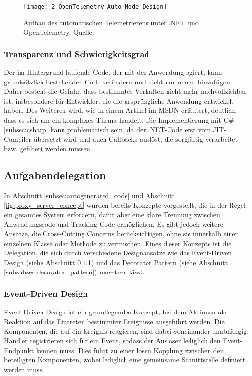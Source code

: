 \begin{figure}[H]
\centering
\texttt{[image: 2\_OpenTelemetry\_Auto\_Mode\_Design]}
\caption{Aufbau des automatischen Telemetrierens unter .NET und OpenTelemetry. Quelle: \cite{otel-dotnet-instrumentation-design}}
\label{fig:opentelemetry_design}
\end{figure}

\subsubsection{Transparenz und Schwierigkeitsgrad}
Der im Hintergrund laufende Code, der mit der Anwendung agiert, kann grundsätzlich bestehenden Code verändern und nicht nur neuen hinzufügen. Daher besteht die Gefahr, dass bestimmtes Verhalten nicht mehr nachvollziehbar ist, insbesondere für Entwickler, die die ursprüngliche Anwendung entwickelt haben. Des Weiteren wird, wie in einem Artikel \cite{Mikunov2003} im MSDN erläutert, deutlich, dass es sich um ein komplexes Thema handelt. Die Implementierung mit C\# \ref{subsec:csharp} kann problematisch sein, da der .NET-Code erst vom JIT-Compiler übersetzt wird und auch Callbacks auslöst, die sorgfältig verarbeitet bzw. gefiltert werden müssen.

\subsection{Aufgabendelegation}
\label{subsec:task_delegation}
In Abschnitt \ref{subsec:autogenerated_code} und Abschnitt \ref{fig:proxy_server_concept} wurden bereits Konzepte vorgestellt, die in der Regel ein gesamtes System erfordern, dafür aber eine klare Trennung zwischen Anwendungscode und Tracking-Code ermöglichen.  
Es gibt jedoch weitere Ansätze, die Cross-Cutting Concerns \cite{crosscutting} berücksichtigen, ohne sie innerhalb einer einzelnen Klasse oder Methode zu vermischen.  
Eines dieser Konzepte ist die Delegation, die sich durch verschiedene Designansätze wie das Event-Driven Design (siehe Abschnitt \ref{subsubsec:event_driven_design}) und das Decorator Pattern (siehe Abschnitt \ref{subsubsec:decorator_pattern}) umsetzen lässt.

\subsubsection{Event-Driven Design}
\label{subsubsec:event_driven_design}
Event-Driven Design ist ein grundlegendes Konzept, bei dem Aktionen als Reaktion auf das Eintreten bestimmter Ereignisse ausgeführt werden.  
Die Komponenten, die auf ein Ereignis reagieren, sind dabei voneinander unabhängig.  
Handler registrieren sich für ein Event, sodass der Auslöser lediglich den Event-Endpunkt kennen muss.  
Dies führt zu einer losen Kopplung zwischen den beteiligten Komponenten, wobei lediglich eine gemeinsame Schnittstelle definiert werden muss.  


